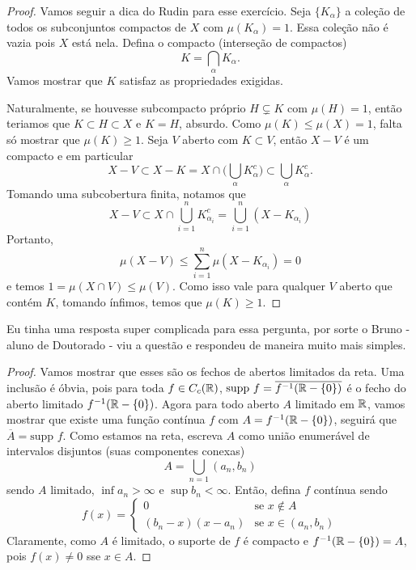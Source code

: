 \begin{problem}
    \label{prob:l4:2}
\end{problem}
\begin{proof}
    Vamos seguir a dica do Rudin para esse exercício. Seja $\{K_\alpha\}$ a coleção de todos 
    os subconjuntos compactos de $X$ com $\mu(K_\alpha) = 1$. Essa coleção não é vazia pois $X$ está nela. 
    Defina o compacto (interseção de compactos)
    $$K = \bigcap_\alpha K_\alpha.$$
    Vamos mostrar que $K$ satisfaz as propriedades exigidas. 
    
    Naturalmente, se houvesse subcompacto próprio  $H \subsetneq K$
    com $\mu(H) = 1$, então teriamos que $K \subset H \subset X$ e $K = H$, absurdo. Como $\mu(K) \leq \mu(X) = 1$, 
    falta só mostrar que $\mu(K) \geq 1$.
    Seja $V$ aberto com $K \subset V$, então $X - V$ é um compacto e em particular
    $$X - V \subset X - K = X \cap \bigg(\bigcup_\alpha K_\alpha^c\bigg) \subset \bigcup_\alpha K_\alpha^c.$$
    Tomando uma subcobertura finita, notamos que
    $$X - V \subset X \cap \bigcup_{i=1}^{n} K_{\alpha_i}^c = \bigcup_{i=1}^{n} (X - K_{\alpha_i})$$
    Portanto, 
    $$\mu(X - V) \leq \sum_{i=1}^{n} \mu(X - K_{\alpha_i}) = 0$$
    e temos $1 = \mu(X \cap V) \leq \mu(V)$. Como isso vale para qualquer $V$ aberto que contém $K$, tomando
    ínfimos, temos que $\mu(K) \geq 1$.
\end{proof}

\begin{problem}
    \label{prob:l4:3}
\end{problem}
Eu tinha uma resposta super complicada para essa pergunta, por sorte o Bruno - aluno de Doutorado - 
viu a questão e respondeu de maneira muito mais simples.
\begin{proof}
    Vamos mostrar que esses são os fechos de abertos limitados da reta. Uma inclusão 
    é óbvia, pois para toda $f \in C_c(\mathbb{R})$, $\text{supp } f = \overline{f^{-1}(\mathbb{R} - \{0\})}$
    é o fecho do aberto limitado $f^{-1}(\mathbb{R} - \{0\})$. Agora para todo aberto $A$ limitado em $\mathbb{R}$, vamos mostrar 
    que existe uma função contínua $f$ com $A = f^{-1}(\mathbb{R} - \{0\})$, seguirá que $\overline{A} = \text{supp }f$.
    Como estamos na reta, escreva $A$ como união enumerável de intervalos disjuntos (suas componentes conexas)
    $$A = \bigcup_{n=1} (a_n, b_n)$$
    sendo $A$ limitado, $\inf a_n > \infty$ e $\sup b_n < \infty$. Então, defina $f$ contínua sendo
    $$f(x) = \begin{cases}
        0 & \text{se } x \not \in A\\
        (b_n - x)(x - a_n) & \text{se } x \in (a_n, b_n)
    \end{cases}$$
    Claramente, como $A$ é limitado, o suporte de $f$ é compacto e $f^{-1}(\mathbb{R} - \{0\}) = A$, pois $f(x) \neq 0$ sse $x \in A$.
\end{proof}

